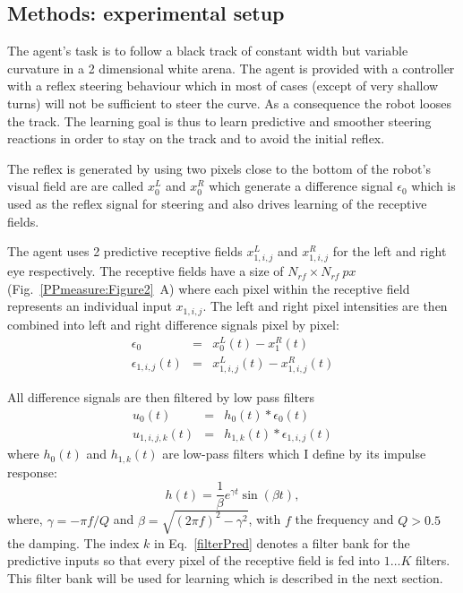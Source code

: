\subsection{Methods: experimental setup \label{Chapter8:RobotStructure}}

The agent's task is to follow a black track of constant width but
variable curvature in a 2 dimensional white arena.  The agent is
provided with a controller with a reflex steering behaviour which in
most of cases (except of very shallow turns) will not be sufficient to
steer the curve.  As a consequence the robot looses the track.
The learning goal is thus to learn predictive and smoother steering
reactions in order to stay on the track and to avoid the initial
reflex.

The reflex is generated by using two pixels close to the bottom of
the robot's visual field are are called $x_0^L$ and $x_0^R$ which
generate a difference signal $\epsilon_0$ which is used as the reflex
signal for steering and also drives learning of the receptive
fields.

The agent uses 2 predictive receptive fields $x_{1,i,j}^{L}$ and
$x_{1,i,j}^{R}$ for the left and right eye respectively. The receptive
fields have a size of $N_{rf} \times N_{rf}~px$ (Fig.~\ref{PPmeasure:Figure2}~A)
where each pixel within the receptive field represents an individual
input $x_{1,i,j}$. The left and right pixel intensities are then
combined into left and right difference signals pixel by pixel:
\begin{eqnarray}
\epsilon_0 & = & x_0^L(t) - x_1^R(t) \label{diffX0} \\
\epsilon_{1,i,j}(t) & = & x_{1,i,j}^{L}(t) - x_{1,i,j}^{R}(t) \label{diffX1}
\end{eqnarray}

All difference signals are then filtered by low pass filters
\begin{eqnarray}
u_0(t) & = & h_0(t) * \epsilon_0(t) \label{filterReflex} \\
u_{1,i,j,k}(t) & = & h_{1,k}(t) * \epsilon_{1,i,j}(t) \label{filterPred}
\end{eqnarray}
where $h_0(t)$ and $h_{1,k}(t)$ are 
low-pass filters which I define by its impulse
response:
\begin{equation}
	h(t)=\frac{1}{\beta}e^{\gamma t}\sin(\beta t),
\end{equation}
where, $\gamma=-\pi f/Q$ and $\beta={\sqrt{(2 \pi f)^2 - \gamma^2}}$,
with $f$ the frequency and $Q>0.5$ the damping. The index
$k$ in Eq.~\ref{filterPred} denotes a filter bank for the predictive
inputs so that every pixel of the receptive field is fed into $1\ldots K$
filters. This filter bank will be used for learning which is described
in the next section.

